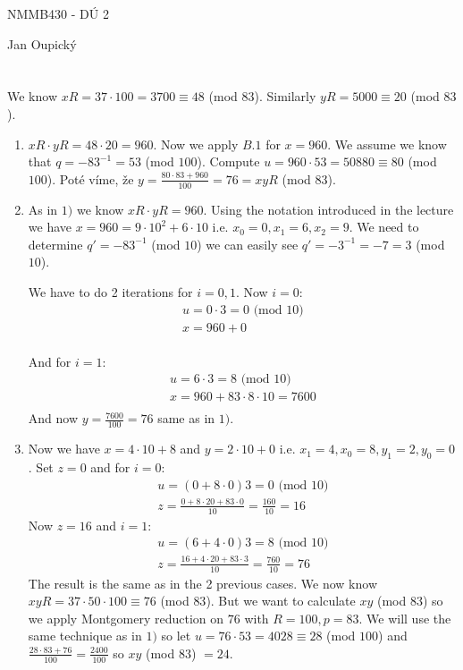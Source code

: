 \documentclass[12pt, a4paper]{article}
\begin{document}
\begin{center}
\large NMMB430 - DÚ 2

\normalsize Jan Oupický
\end{center}
\vspace{1\baselineskip}

\section{}
We know $xR = 37\cdot 100 = 3700 \equiv 48$ (mod $83$). Similarly $yR = 5000 \equiv 20$ (mod $83$).
\begin{enumerate}
\item $xR \cdot yR = 48\cdot 20 = 960$. Now we apply $B.1$ for $x = 960$. We assume we know that $q = - 83^{-1} = 53$ (mod $100$). Compute $u = 960\cdot 53 = 50880 \equiv 80$ (mod $100$). Poté víme, že $y = \frac{80\cdot 83 + 960}{100} = 76 = xyR$ (mod $83$).

\item As in $1)$ we know $xR\cdot yR = 960$. Using the notation introduced in the lecture we have $x = 960 = 9\cdot 10^2 + 6 \cdot 10$ i.e. $x_0 = 0, x_1 = 6, x_2 = 9$. We need to determine $q' = -83^{-1}$ (mod $10$) we can easily see $q' = -3^{-1} = -7 = 3$ (mod $10$).

We have to do 2 iterations for $i = 0,1$. Now $i=0$:
\begin{gather*}
u = 0\cdot 3 = 0 \text{ (mod }10\text{)}\\
x = 960+0\\
\end{gather*}

And for $i=1$:
\begin{gather*}
u = 6\cdot 3 = 8 \text{ (mod }10\text{)}\\
x = 960+83\cdot 8 \cdot 10 = 7600\\
\end{gather*}
And now $y = \frac{7600}{100} = 76$ same as in $1)$.

\item Now we have $x = 4\cdot 10 + 8$ and $y = 2\cdot 10 + 0$ i.e. $x_1=4, x_0=8, y_1 = 2, y_0 = 0$. Set $z=0$ and for $i=0$:
\begin{gather*}
u = (0+ 8\cdot 0)3 = 0 \text{ (mod }10\text{)}\\
z = \frac{0+8\cdot 20 + 83\cdot 0}{10} = \frac{160}{10} = 16
\end{gather*}
Now $z=16$ and $i=1$:
\begin{gather*}
u = (6+ 4\cdot 0)3 = 8 \text{ (mod }10\text{)}\\
z = \frac{16+4\cdot 20 + 83\cdot 3}{10} = \frac{760}{10} = 76
\end{gather*}
The result is the same as in the 2 previous cases. We now know $xyR = 37\cdot50\cdot100 \equiv 76$ (mod $83$). But we want to calculate $xy$ (mod $83$) so we apply Montgomery reduction on $76$ with $R=100, p=83$. We will use the same technique as in $1)$ so let $u = 76 \cdot 53 = 4028 \equiv 28$ (mod $100$) and $\frac{28\cdot 83 + 76}{100} = \frac{2400}{100}$ so $xy$ (mod $83$) $= 24$.

\end{enumerate}
\end{document}
